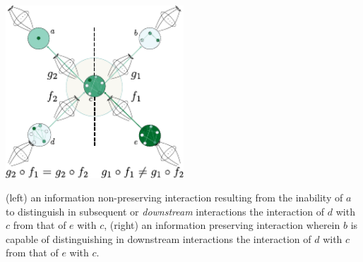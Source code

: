 \begin{frame}
\centering\includegraphics[width=0.5\textwidth]{fig/infopres.pdf}

(left) an information non-preserving interaction resulting from the inability of $a$ to distinguish in subsequent or {\it downstream} interactions the interaction of $d$  with $c$ from that of $e$ with $c$, (right) an information preserving interaction wherein $b$ is capable of distinguishing in downstream interactions the interaction of $d$  with $c$ from that of $e$ with $c$.
\end{frame}